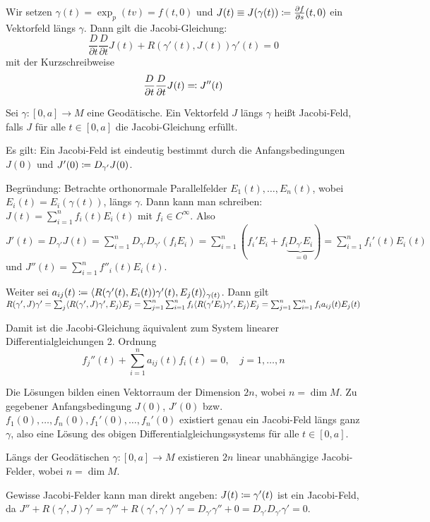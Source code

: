 \documentclass[a4paper,twoside,DIV15,BCOR12mm]{scrbook}
\begin{document}
Wir setzen $\gamma(t) = \exp_p(tv) = f(t,0)$ und $J(t)\equiv J(\gamma(t)) \da \frac{\partial f}{\partial s} (t,0)$ ein Vektorfeld längs $\gamma$. Dann gilt die Jacobi-Gleichung:
\[
\frac D{\partial t} \frac D{\partial t} J(t) + R(\gamma'(t), J(t))\gamma'(t) = 0
\]
mit der Kurzschreibweise
\[
\frac D{\partial t} \frac D{\partial t} J(t) \ad J''(t)
\]

\begin{definition}
Sei  $\gamma: [0,a] \to M$ eine Geodätische. Ein Vektorfeld $J$ längs $\gamma$ heißt Jacobi-Feld, falls $J$ für alle $t\in[0,a]$ die Jacobi-Gleichung erfüllt.
\end{definition}

Es gilt: Ein Jacobi-Feld ist eindeutig bestimmt durch die Anfangsbedingungen $J(0)$ und $J'(0)\da D_{\gamma'} J(0)$.


Begründung: Betrachte orthonormale Parallelfelder $E_1(t),\ldots,E_n(t)$, wobei $E_i(t) = E_i(\gamma(t))$, längs $\gamma$. Dann kann man schreiben: $J(t) = \sum_{i=1}^n f_i(t) E_i(t)$ mit $f_i\in C^\infty$. Also $J'(t) = D_{\gamma'}J(t) = \sum_{i=1}^n D_{\gamma'} D_{\gamma'} (f_i E_i)= \sum_{i=1}^n (f_i' E_i+ f_i \underbrace{D_{\gamma'}E_i}_{=0}) 
= \sum_{i=1}^n f_i'(t) E_i(t)$ und $J''(t) = \sum_{i=1}^n f''_i(t) E_i(t)$.

Weiter sei $a_{ij}(t) \da \ksp {R(\gamma'(t), E_i(t))\gamma'(t)} {E_j(t)}_{\gamma(t)}$. Dann gilt $R(\gamma',J)\gamma' = \sum_j \langle R(\gamma',J)\gamma',E_j\rangle E_j
= \sum_{j=1}^n \sum_{i=1}^n f_i \langle R(\gamma' E_i)\gamma',E_j\rangle E_j
= \sum_{j=1}^n \sum_{i=1}^n f_i a_{ij}(t) E_j(t)$

Damit ist die Jacobi-Gleichung äquivalent zum System linearer Differentialgleichungen
2. Ordnung
\[
f_j''(t) + \sum_{i=1}^n a_{ij}(t) f_i(t) = 0,\quad j=1,\ldots,n
\]

Die Lösungen bilden einen Vektorraum der Dimension $2n$, wobei $n=\dim M$. Zu gegebener Anfangsbedingung $J(0)$, $J'(0)$ bzw. $f_1(0),\ldots,f_n(0),f_1'(0),\ldots,f_n'(0)$ existiert genau ein Jacobi-Feld längs ganz $\gamma$, also eine Lösung des obigen Differentialgleichungssystems für alle $t\in[0,a]$.

\begin{folgerung*}
Längs der Geodätischen $\gamma:[0,a] \to M$ existieren $2n$ linear unabhängige Jacobi-Felder, wobei $n=\dim M$.
\end{folgerung*}

\begin{bemerkung}
Gewisse Jacobi-Felder kann man direkt angeben:  $J(t) \da \gamma'(t)$ ist ein Jacobi-Feld, da $J'' + R(\gamma',J)\gamma' = \gamma''' + R(\gamma',\gamma')\gamma' = D_{\gamma'}\gamma'' + 0 = D_{\gamma'}D_{\gamma'} \gamma' = 0$.
\end{bemerkung}
\end{document}
